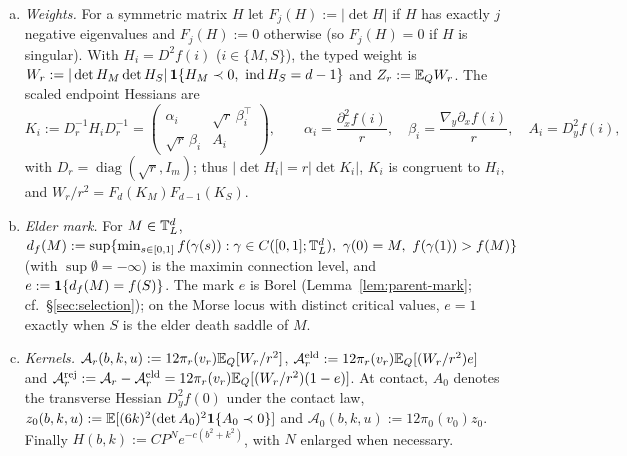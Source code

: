 \begin{convention}
\begin{enumerate}[(a),leftmargin=2em,itemsep=2pt]
with $b\in\R$ and gap mark $k>0$; in the notation of (3.5) of the main text $k=\kappa/6$, and the lifetime is $\ell=kr^3$. Put $P:=1+|b|+k$. The observation vector $U_r$ has the axial rows $\tfrac12(f(M)+f(S))$, $(f(S)-f(M))/r$, $(\partial_xf(S)-\partial_xf(M))/r$, $\tfrac6{r^2}[\partial_xf(M)+\partial_xf(S)-2(f(S)-f(M))/r]$ and the transverse rows $\tfrac12(\partial_{y_j}f(M)+\partial_{y_j}f(S))$, $(\partial_{y_j}f(S)-\partial_{y_j}f(M))/r$; the map from the raw pins $(f(M),\nabla f(M),f(S),\nabla f(S))$ to $U_r$ has absolute determinant $12r^{-(d+3)}$, and the target of $U_r$ is $v_r=(b-kr^3/2,\,-kr^2,\,0,\,12k,\,0,\dots,0)$. At $r=0$, $U_0=(f,\partial_xf,\partial_x^2f,\partial_x^3f,\nabla_yf,\nabla_y\partial_xf)(0)$ with target $v_0=v_0(b,k)=(b,0,0,12k,0,\dots,0)$. We write $\pi_r$, $\pi_0$ for the Gaussian densities of $U_r$, $U_0$, $Q=Q_{r,b,k}$ for the continuous Gaussian regression law of the field given $U_r=v_r$, and call the regression law given $U_0=v_0$ the \emph{contact law}.
\item \emph{Weights.} For a symmetric matrix $H$ let $F_j(H):=|\det H|$ if $H$ has exactly $j$ negative eigenvalues and $F_j(H):=0$ otherwise (so $F_j(H)=0$ if $H$ is singular). With $H_i=D^2f(i)$ ($i\in\{M,S\}$), the typed weight is $W_r:=|\det H_M\det H_S|\,\mathbf 1\{H_M\prec0,\ \operatorname{ind} H_S=d-1\}$ and $Z_r:=\mathbb E_QW_r$. The scaled endpoint Hessians are
\[
K_i:=D_r^{-1}H_iD_r^{-1}=\begin{pmatrix}\alpha_i&\sqrt r\,\beta_i^{\top}\\ \sqrt r\,\beta_i&A_i\end{pmatrix},\qquad \alpha_i=\frac{\partial_x^2f(i)}r,\quad \beta_i=\frac{\nabla_y\partial_xf(i)}r,\quad A_i=D_y^2f(i),
\]
with $D_r=\operatorname{diag}(\sqrt r,I_m)$; thus $|\det H_i|=r|\det K_i|$, $K_i$ is congruent to $H_i$, and $W_r/r^2=F_d(K_M)F_{d-1}(K_S)$.
\item \emph{Elder mark.} For $M\in\mathbb T^d_L$, $d_f(M):=\sup\{\min_{s\in[0,1]}f(\gamma(s)):\gamma\in C([0,1];\mathbb T^d_L),\ \gamma(0)=M,\ f(\gamma(1))>f(M)\}$ (with $\sup\emptyset=-\infty$) is the maximin connection level, and $e:=\mathbf 1\{d_f(M)=f(S)\}$. The mark $e$ is Borel \cite[\S8]{parentP} (Lemma~\ref{lem:parent-mark}; cf.\ \S\ref{sec:selection}); on the Morse locus with distinct critical values, $e=1$ exactly when $S$ is the elder death saddle of $M$.
\item \emph{Kernels.} $\mathcal A_r(b,k,u):=12\pi_r(v_r)\mathbb E_Q[W_r/r^2]$, $\mathcal A^{\mathrm{eld}}_r:=12\pi_r(v_r)\mathbb E_Q[(W_r/r^2)e]$ and $\mathcal A^{\mathrm{rej}}_r:=\mathcal A_r-\mathcal A^{\mathrm{eld}}_r=12\pi_r(v_r)\mathbb E_Q[(W_r/r^2)(1-e)]$. At contact, $A_0$ denotes the transverse Hessian $D_y^2f(0)$ under the contact law, $z_0(b,k,u):=\mathbb E[(6k)^2(\det A_0)^2\mathbf 1\{A_0\prec0\}]$ and $\mathcal A_0(b,k,u):=12\pi_0(v_0)z_0$. Finally $H(b,k):=CP^Ne^{-c(b^2+k^2)}$, with $N$ enlarged when necessary.

\end{enumerate}
\end{convention}
